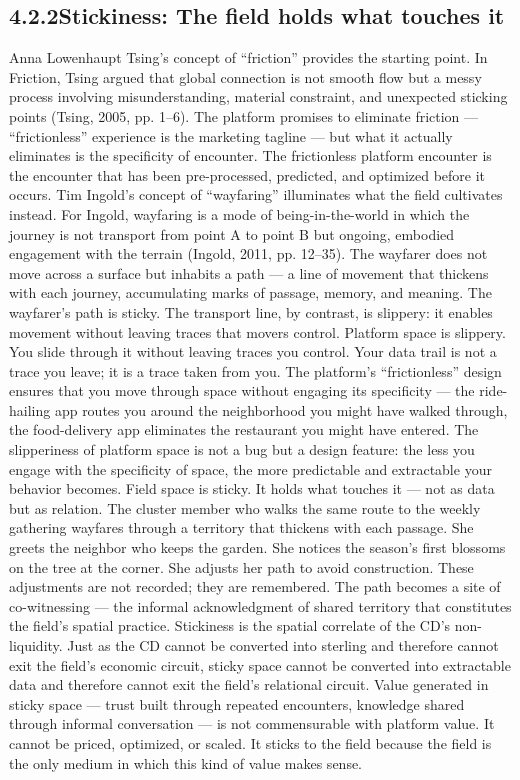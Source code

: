 \subsection{4.2.2\quad Stickiness: The field holds what touches it}

Anna Lowenhaupt Tsing’s concept of “friction” provides the starting point. In Friction, Tsing argued that global connection is not smooth flow but a messy process involving misunderstanding, material constraint, and unexpected sticking points (Tsing, 2005, pp. 1–6). The platform promises to eliminate friction — “frictionless” experience is the marketing tagline — but what it actually eliminates is the specificity of encounter. The frictionless platform encounter is the encounter that has been pre-processed, predicted, and optimized before it occurs. Tim Ingold’s concept of “wayfaring” illuminates what the field cultivates instead. For Ingold, wayfaring is a mode of being-in-the-world in which the journey is not transport from point A to point B but ongoing, embodied engagement with the terrain (Ingold, 2011, pp. 12–35). The wayfarer does not move across a surface but inhabits a path — a line of movement that thickens with each journey, accumulating marks of passage, memory, and meaning. The wayfarer’s path is sticky. The transport line, by contrast, is slippery: it enables movement without leaving traces that movers control. Platform space is slippery. You slide through it without leaving traces you control. Your data trail is not a trace you leave; it is a trace taken from you. The platform’s “frictionless” design ensures that you move through space without engaging its specificity — the ride-hailing app routes you around the neighborhood you might have walked through, the food-delivery app eliminates the restaurant you might have entered. The slipperiness of platform space is not a bug but a design feature: the less you engage with the specificity of space, the more predictable and extractable your behavior becomes. Field space is sticky. It holds what touches it — not as data but as relation. The cluster member who walks the same route to the weekly gathering wayfares through a territory that thickens with each passage. She greets the neighbor who keeps the garden. She notices the season’s first blossoms on the tree at the corner. She adjusts her path to avoid construction. These adjustments are not recorded; they are remembered. The path becomes a site of co-witnessing — the informal acknowledgment of shared territory that constitutes the field’s spatial practice. Stickiness is the spatial correlate of the CD’s non-liquidity. Just as the CD cannot be converted into sterling and therefore cannot exit the field’s economic circuit, sticky space cannot be converted into extractable data and therefore cannot exit the field’s relational circuit. Value generated in sticky space — trust built through repeated encounters, knowledge shared through informal conversation — is not commensurable with platform value. It cannot be priced, optimized, or scaled. It sticks to the field because the field is the only medium in which this kind of value makes sense.


